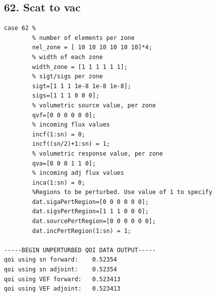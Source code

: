 \documentclass{article}
\begin{document}
\subsection{62. Scat to vac}
\begin{verbatim}
case 62 %
        % number of elements per zone
        nel_zone = [ 10 10 10 10 10 10]*4;
        % width of each zone
        width_zone = [1 1 1 1 1 1];
        % sigt/sigs per zone
        sigt=[1 1 1 1e-8 1e-8 1e-8];
        sigs=[1 1 1 0 0 0];
        % volumetric source value, per zone
        qvf=[0 0 0 0 0 0];
        % incoming flux values
        incf(1:sn) = 0;
        incf((sn/2)+1:sn) = 1;
        % volumetric response value, per zone
        qva=[0 0 0 1 1 0];
        % incoming adj flux values
        inca(1:sn) = 0;
        %Regions to be perturbed. Use value of 1 to specify
        dat.sigaPertRegion=[0 0 0 0 0 0];
        dat.sigsPertRegion=[1 1 1 0 0 0];
        dat.sourcePertRegion=[0 0 0 0 0 0];
        dat.incPertRegion(1:sn) = 1;
        
-----BEGIN UNPERTURBED QOI DATA OUTPUT----- 
qoi using sn forward: 	 0.52354 
qoi using sn adjoint: 	 0.52354 
qoi using VEF forward: 	 0.523413 
qoi using VEF adjoint: 	 0.523413 
\end{verbatim}
\end{document}
